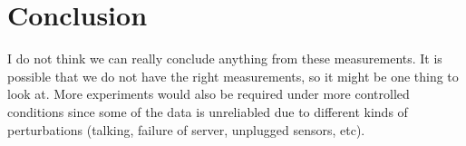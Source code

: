 \documentclass[a4paper,10pt]{article}
\begin{document}
\section{Conclusion}

I do not think we can really conclude anything from these measurements. It is possible that we do not have the right measurements, so it might be one thing to look at. More experiments would also be required under more controlled conditions since some of the data is unreliabled due to different kinds of perturbations (talking, failure of server, unplugged sensors, etc).

\printbibliography
\end{document}

